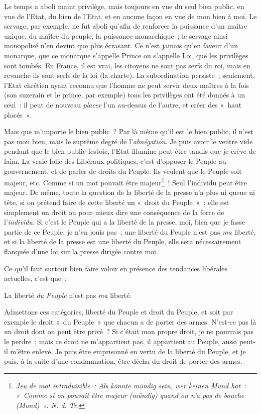 \documentclass[french,twoside]{book} %
\begin{document}
\noindent Le temps a aboli maint privilège, mais toujours en vue du seul bien public, en vue de l’Etat, du bien de l’Etat, et en aucune façon en vue de mon bien à moi. Le servage, par exemple, ne fut aboli qu’afin de renforcer la puissance d’un maître unique,  du maître du peuple, la puissance monarchique ; le servage ainsi monopolisé n’en devint que plus écrasant. Ce n’est jamais qu’en faveur d’un monarque, que ce monarque s’appelle Prince ou s’appelle Loi, que les privilèges sont tombés. En France, il est vrai, les citoyens ne sont pas serfs du roi, mais en revanche ils sont serfs de la loi (la charte). La subordination persiste ; seulement, l’Etat chrétien ayant reconnu que l’homme ne peut servir deux maîtres à la fois (son suzerain et le prince, par exemple) tous les privilèges ont été donnés à un seul : il peut de nouveau \emph{placer} l’un au-dessus de l’autre, et créer des « haut placés ».\par
Mais que m’importe le bien public ? Par là même qu’il est le bien public, il n’est pas mon bien, mais le suprême degré de l’\emph{abnégation}. Je puis avoir le ventre vide pendant que le bien public festoie, l’Etat illumine peut-être tandis que je crève de faim. La vraie folie des Libéraux politiques, c’est d’opposer le Peuple au gouvernement, et de parler de droits du Peuple. Ils veulent que le Peuple soit majeur, etc. Comme si un mot pouvait être majeur\footnote{ \noindent \emph{Jeu de mot intraduisible : Als könnte mündig sein, wer keinen Mund hat : « Comme si on pouvait être majeur (mündig) quand on n’a pas de bouche (Mund) ». N. d. Tr.}
 } ! Seul l’individu peut être majeur. De même, toute la question de la liberté de la presse n’a plus ni queue ni tête, si on prétend faire de cette liberté un « droit du Peuple » : elle est simplement un droit ou pour mieux dire une conséquence de la force de l’\emph{individu. }Si c’est le Peuple qui a la liberté de la presse, moi, bien que je fasse partie de ce Peuple, je n’en jouis pas ; une liberté du Peuple n’est pas \emph{ma} liberté, et si la liberté de la presse est une liberté du Peuple, elle sera nécessairement flanquée d’une loi sur la presse dirigée contre moi.\par
Ce qu’il faut surtout bien faire valoir en présence des tendances libérales actuelles, c’est que :\par
 La liberté \emph{du Peuple} n’est pas \emph{ma} liberté.\par
Admettons ces catégories, liberté du Peuple et droit du Peuple, et soit par exemple le droit « du Peuple » que chacun a de porter des armes. N’est-ce pas là un droit dont on peut être privé ? Si c’était mon propre droit, je ne pourrais pas le perdre ; mais ce droit ne m’appartient pas, il appartient au Peuple, aussi peut-il m’être enlevé. Je puis être emprisonné en vertu de la liberté du Peuple, et je puis, à la suite d’une condamnation, être déchu du droit de porter des armes.\par
\end{document}
